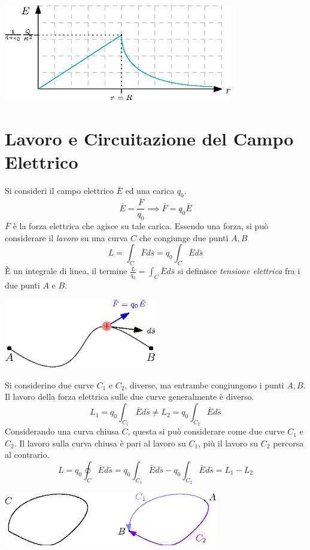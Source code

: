\documentclass[10pt, letterpaper]{report}
\begin{document}
\begin{center}
    \includegraphics[width=0.75\textwidth]{images/campoSfera.eps}
\end{center}
\flowerLine \section{Lavoro e Circuitazione del Campo Elettrico}
Si consideri il campo elettrico $\bar E$ ed una carica $q_0$.
$$ \bar E = \frac{\bar F}{q_0}\implies \bar F = q_0\bar E$$
$\bar F$ è la forza elettrica che agisce su tale carica. Essendo una forza, si può considerare il \textit{lavoro} su una curva $C$ che congiunge due punti $A,B$
$$ L=\int_C\bar F d\bar s = q_0\int_C \bar E d\bar s$$
È un integrale di linea, il termine $\frac{L}{q_0}=\int_C \bar E d\bar s$ si definisce \textit{tensione elettrica} fra i due punti $A$ e $B$.\begin{center}
    \includegraphics[width=0.5\textwidth]{images/lavoroElettrico1.eps}
\end{center}
Si considerino due curve $C_1$ e $C_2$, diverse, ma entrambe congiungono i punti $A,B$. Il lavoro della forza elettrica sulle due curve generalmente è diverso.
 $$ L_1= q_0\int_{C_1} \bar E d\bar s \ne L_2= q_0\int_{C_2} \bar E d\bar s$$
 Considerando una curva chiusa $C$, questa si può considerare come due curve $C_1$ e $C_2$. Il lavoro sulla curva chiusa è pari al lavoro su $C_1$, più il lavoro su $C_2$ percorsa al contrario.
 $$ L=q_0\oint_C \bar E d\bar s = q_0\int_{C_1} \bar E d\bar s-q_0\int_{C_2} \bar E d\bar s=L_1-L_2$$
 \begin{center}
    \includegraphics[width=0.7\textwidth]{images/curve.eps}
\end{center}
\end{document}
